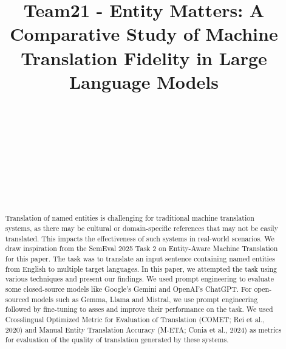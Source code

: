 \documentclass{ecai}
\begin{document}
\begin{frontmatter}

\title{Team21 - Entity Matters: A Comparative Study of Machine Translation Fidelity in Large Language Models}

\author[A]{}
\author[A]{~}
\author[A]{~}
\author[A]{~}
\author[A]{~}
\author[A]{~}


\begin{abstract}
Translation of named entities is challenging for traditional machine translation systems, as there may be cultural 
or domain-specific references that may not be easily translated. 
This impacts the effectiveness of such systems in real-world scenarios. 
We draw inspiration from the SemEval 2025 Task 2 on Entity-Aware Machine Translation for this paper. 
The task was to translate an input sentence containing named entities from English to multiple target languages. 
In this paper, we attempted the task using various techniques and present our findings. 
We used prompt engineering to evaluate some closed-source models like Google's Gemini and OpenAI's ChatGPT. 
For open-sourced models such as Gemma, Llama and Mistral, we use prompt engineering followed by fine-tuning
to asses and improve their performance on the task.
We used Crosslingual Optimized Metric for Evaluation of Translation (COMET; Rei et al., 2020)\cite{conia-etal-2024-m-eta}
and Manual Entity Translation Accuracy (M-ETA; Conia et al., 2024)\cite{rei-etal-2020-comet} 
as metrics for evaluation of the quality of translation generated by these systems.
\end{abstract}
\end{frontmatter}

\end{document}
